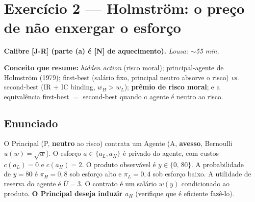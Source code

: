 \documentclass[11pt,a4paper]{article}
\newcommand{\calY}{\textbf{\textcolor{amarelo}{[N]}}} %
\newcommand{\calR}{\textbf{\textcolor{verm}{[J-R]}}}  %
\newcommand{\dc}[2]{#1{,}#2}
\newif\ifsolucao
\begin{document}
\section*{\textcolor{insper}{Exercício 2 — Holmström: o preço de não enxergar o esforço}}
\noindent\textbf{Calibre \calR{} (parte (a) é \calY{} de aquecimento).} \quad \emph{Lousa: $\sim$55 min.}
\par\smallskip
\noindent\textbf{Conceito que resume:} \emph{hidden action} (risco moral); principal-agente
de Holmström (1979); first-best (salário fixo, principal neutro absorve o risco) \emph{vs.}
second-best (IR + IC binding, $w_H > w_L$); \textbf{prêmio de risco moral}; e a
equivalência first-best $=$ second-best quando o agente é neutro ao risco.

\subsection*{Enunciado}
O Principal (P, \textbf{neutro} ao risco) contrata um Agente (A, \textbf{avesso},
Bernoulli $u(w)=\sqrt{w}$). O esforço $a \in \{a_L, a_H\}$ é privado do agente, com custos
$c(a_L)=0$ e $c(a_H)=2$. O produto observável é $y \in \{0,\,80\}$. A probabilidade de
$y=80$ é $\pi_H = \dc{0}{8}$ sob esforço alto e $\pi_L = \dc{0}{4}$ sob esforço baixo. A
utilidade de reserva do agente é $\bar U = 3$. O contrato é um salário $w(y)$ condicionado
ao produto. \textbf{O Principal deseja induzir $a_H$} (verifique que é eficiente fazê-lo).

\ifsolucao
\end{document}
